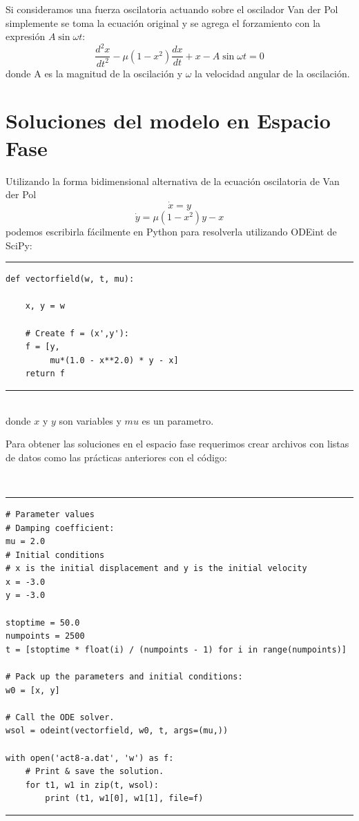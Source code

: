 \documentclass{article}
\begin{document}
Si consideramos una fuerza oscilatoria actuando sobre el oscilador Van der Pol simplemente se toma la ecuación original y se agrega el forzamiento con la expresión $A\sin\omega t$:
\[ \frac{d^2x}{dt^2}-\mu(1-x^2)\frac{dx}{dt}+x-A\sin\omega t=0 \]
donde A es la magnitud de la oscilación y $\omega$ la velocidad angular de la oscilación.

\section{Soluciones del modelo en Espacio Fase}

Utilizando la forma bidimensional alternativa de la ecuación oscilatoria de Van der Pol
\[ \dot{x} = y \]
\[ \dot{y} = \mu(1-x^2)y-x \]
podemos escribirla fácilmente en Python para resolverla utilizando ODEint de SciPy:
~\\
\hrule
\begin{verbatim}
def vectorfield(w, t, mu):
    
    x, y = w

    # Create f = (x',y'):
    f = [y,
         mu*(1.0 - x**2.0) * y - x]
    return f

\end{verbatim}
\hrule
~\\
donde $x$ y $y$ son variables y $mu$ es un parametro.

\newpage

Para obtener las soluciones en el espacio fase requerimos crear archivos con listas de datos como las prácticas anteriores con el código:

~\\
\hrule
\begin{verbatim}
# Parameter values
# Damping coefficient:
mu = 2.0
# Initial conditions
# x is the initial displacement and y is the initial velocity
x = -3.0
y = -3.0

stoptime = 50.0
numpoints = 2500
t = [stoptime * float(i) / (numpoints - 1) for i in range(numpoints)]

# Pack up the parameters and initial conditions:
w0 = [x, y]

# Call the ODE solver.
wsol = odeint(vectorfield, w0, t, args=(mu,))

with open('act8-a.dat', 'w') as f:
    # Print & save the solution.
    for t1, w1 in zip(t, wsol):
        print (t1, w1[0], w1[1], file=f)
\end{verbatim}
\hrule 
~\\
\end{document}
